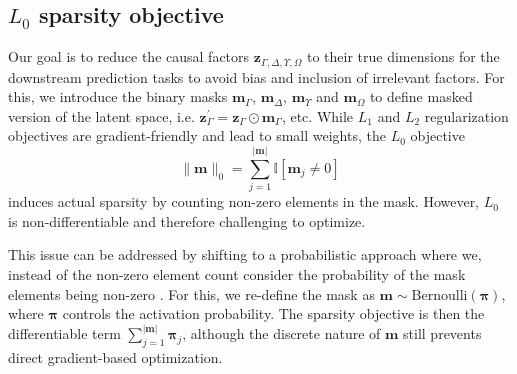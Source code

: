 \documentclass[doubleblind]{ecai}
\begin{document}
	\subsection{$L_0$ sparsity objective} 
	\label{sec:l0}
	
	
	
	Our goal is to reduce the causal factors $\mathbf{z}_{\Gamma , \Delta , \Upsilon,\Omega}$ to their true dimensions for the downstream prediction tasks to avoid bias and inclusion of irrelevant factors. For this, we introduce the binary masks $\mathbf{m}_\Gamma$, $\mathbf{m}_\Delta$, $\mathbf{m}_\Upsilon$ and $\mathbf{m}_\Omega$ to define masked version of the latent space, i.e. $\mathbf{z}_\Gamma^\prime = \mathbf{z}_\Gamma \odot \mathbf{m}_\Gamma$, etc. While $L_1$ and $L_2$ regularization objectives are gradient-friendly and lead to small weights, the $L_0$ objective 
	$$
	\| \mathbf {m}\|_0 = \sum_{j=1}^{| \mathbf {m}|} \mathbb{I}[ \mathbf {m}_j \neq 0]
	$$
	induces actual sparsity by counting non-zero elements in the mask. However, $L_0$ is non-differentiable and therefore challenging to optimize.
	
	
	
	
	This issue can be addressed by shifting to a probabilistic approach where we, instead of the non-zero element count consider the probability of the mask elements being non-zero \citep{louizos2018learning}. For this, we re-define the mask as $\mathbf{m} \sim \text{Bernoulli}( \boldsymbol  \pi)$, where $\boldsymbol{\pi}$ controls the activation probability. The sparsity objective is then the differentiable term $\sum_{j=1}^{| \mathbf{m} |} \boldsymbol  \pi_j$, although the discrete nature of $\mathbf{m}$ still prevents direct gradient-based optimization. 

	
\end{document}
